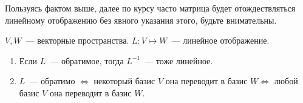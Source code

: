 \begin{remark}
    Пользуясь фактом выше, далее по курсу часто матрица будет отождествляться линейному отображению без явного
    указания этого, будьте внимательны.
\end{remark}
\begin{theorem}
    $V,W$~--- векторные пространства. $L: V\mapsto W$~--- линейное отображение.
    \begin{enumerate}
        \item Если $L$~--- обратимое, тогда $L^{-1}$~--- тоже линейное.
        \item $L$~--- обратимо $\Leftrightarrow$ некоторый базис $V$ она переводит в базис $W\Leftrightarrow$ 
            любой базис $V$ она переводит в базис $W$.
    \end{enumerate}
\end{theorem}
